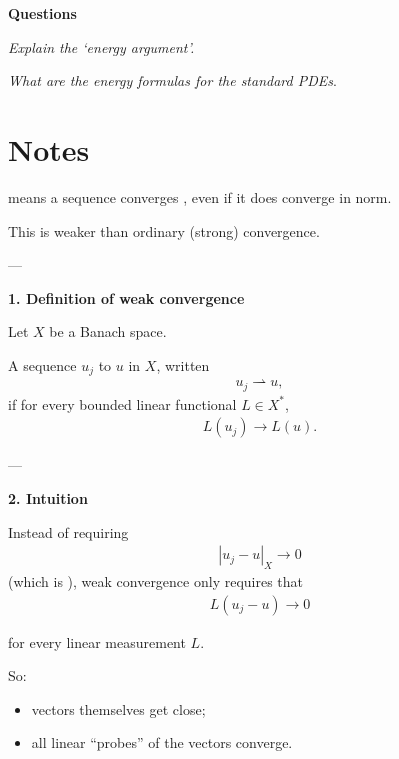 \documentclass[12pt,a4paper]{report}
\begin{document}
\textbf{Questions}

\begin{description}
	\item \textit{Explain the `energy argument'.}
	\item \textit{What are the energy formulas for the standard PDEs}.
\end{description}


\newpage
\section*{Notes}

\begin{description}
	\item {}

 means a sequence converges , even if it does  converge in norm.

This is weaker than ordinary (strong) convergence.

---
\begin{description}

\item \textbf{1. Definition of weak convergence}

Let $X$ be a Banach space.

A sequence $u_j$  to $u$ in $X$, written
\begin{align*}
u_j \rightharpoonup u,
\end{align*}
if for every bounded linear functional $L\in X^*$,
\begin{align*}
L(u_j)\to L(u).
\end{align*}

---

\item \textbf{2. Intuition}

Instead of requiring
\begin{align*}
|u_j-u|_X\to 0
\end{align*}
(which is ), weak convergence only requires that
\begin{align*}
L(u_j-u)\to 0
\end{align*}

for every linear measurement $L$.

So:
\begin{itemize}
\item {} vectors themselves get close;
\item {} all linear “probes” of the vectors converge.
\end{itemize}


\end{description}
\end{description}
\end{document}
